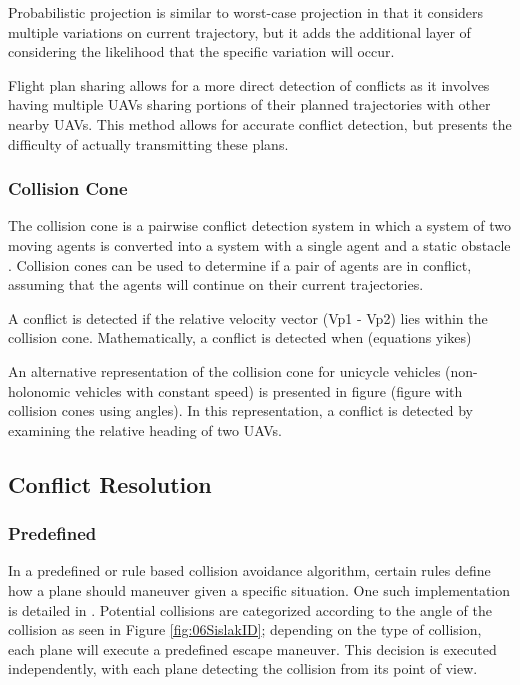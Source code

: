\documentclass[conference]{IEEEtran}
\begin{document}
Probabilistic projection is similar to worst-case projection in that it considers multiple variations on current trajectory, but it adds the additional layer of considering the likelihood that the specific variation will occur.  

Flight plan sharing allows for a more direct detection of conflicts as it involves having multiple UAVs sharing portions of their planned trajectories with other nearby UAVs.  This method allows for accurate conflict detection, but presents the difficulty of actually transmitting these plans.  

\subsubsection{Collision Cone}
The collision cone is a pairwise conflict detection system in which a system of two moving agents is converted into a system with a single agent and a static obstacle \cite{danielscollision}.  Collision cones can be used to determine if a pair of agents are in conflict, assuming that the agents will continue on their current trajectories.

A conflict is detected if the relative velocity vector (Vp1 - Vp2) lies within the collision cone. Mathematically, a conflict is detected when (equations yikes)


An alternative representation of the collision cone for unicycle vehicles (non-holonomic vehicles with constant speed) is presented in figure (figure with collision cones using angles).  In this representation, a conflict is detected by examining the relative heading of two UAVs.

\subsection{Conflict Resolution}


\subsubsection{Predefined}
In a predefined or rule based collision avoidance algorithm, certain rules define how a plane should maneuver given a specific situation.
One such implementation is detailed in \cite{sislak2006negotiation}. Potential collisions are categorized according to the angle of the collision as seen in Figure \ref{fig:06SislakID}; depending on the type of collision, each plane will execute a predefined escape maneuver. This decision is executed independently, with each plane detecting the collision from its point of view.  
\end{document}
